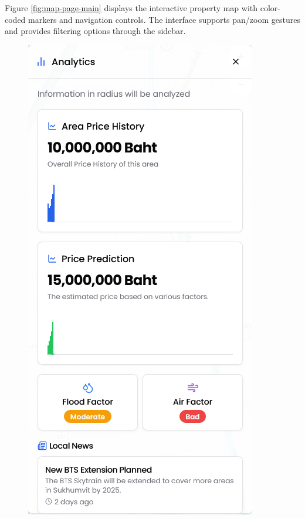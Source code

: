 Figure \ref{fig:map-page-main} displays the interactive property map with color-coded markers and navigation controls. The interface supports pan/zoom gestures and provides filtering options through the sidebar.

\begin{figure}[h]
\centering
\begin{minipage}[b]{0.45\textwidth}
\centering
\includegraphics[width=\textwidth]{assets/ui/map-page-analytic.png}

\end{minipage}
\end{figure}
